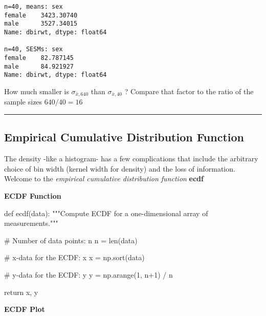 \documentclass[
  letterpaper,
  DIV=11,
  numbers=noendperiod]{scrreprt}
\newenvironment{Shaded}{\begin{snugshade}}{\end{snugshade}}
\newcommand{\BuiltInTok}[1]{\textcolor[rgb]{0.00,0.23,0.31}{#1}}
\newcommand{\CommentTok}[1]{\textcolor[rgb]{0.37,0.37,0.37}{#1}}
\newcommand{\ControlFlowTok}[1]{\textcolor[rgb]{0.00,0.23,0.31}{#1}}
\newcommand{\DecValTok}[1]{\textcolor[rgb]{0.68,0.00,0.00}{#1}}
\newcommand{\KeywordTok}[1]{\textcolor[rgb]{0.00,0.23,0.31}{#1}}
\newcommand{\NormalTok}[1]{\textcolor[rgb]{0.00,0.23,0.31}{#1}}
\newcommand{\OperatorTok}[1]{\textcolor[rgb]{0.37,0.37,0.37}{#1}}
\begin{document}
\begin{verbatim}
n=40, means: sex
female    3423.30740
male      3527.34015
Name: dbirwt, dtype: float64

n=40, SESMs: sex
female    82.787145
male      84.921927
Name: dbirwt, dtype: float64
\end{verbatim}

How much smaller is \(\sigma_{\bar{x},640}\) than
\(\sigma_{\bar{x},40}\) ? Compare that factor to the ratio of the sample
sizes \(640/40 = 16\)

\begin{center}\rule{0.5\linewidth}{0.5pt}\end{center}

\hypertarget{empirical-cumulative-distribution-function}{%
\subsection{Empirical Cumulative Distribution
Function}\label{empirical-cumulative-distribution-function}}

The density -like a histogram- has a few complications that include the
arbitrary choice of bin width (kernel width for density) and the loss of
information. Welcome to the \emph{empirical cumulative distribution
function} \textbf{ecdf}

\textbf{ECDF Function}

\begin{Shaded}
\begin{Highlighting}[]
\KeywordTok{def}\NormalTok{ ecdf(data):}
    \CommentTok{"""Compute ECDF for a one{-}dimensional array of measurements."""}

    \CommentTok{\# Number of data points: n}
\NormalTok{    n }\OperatorTok{=} \BuiltInTok{len}\NormalTok{(data)}

    \CommentTok{\# x{-}data for the ECDF: x}
\NormalTok{    x }\OperatorTok{=}\NormalTok{ np.sort(data)}

    \CommentTok{\# y{-}data for the ECDF: y}
\NormalTok{    y }\OperatorTok{=}\NormalTok{ np.arange(}\DecValTok{1}\NormalTok{, n}\OperatorTok{+}\DecValTok{1}\NormalTok{) }\OperatorTok{/}\NormalTok{ n}

    \ControlFlowTok{return}\NormalTok{ x, y}
\end{Highlighting}
\end{Shaded}

\textbf{ECDF Plot}
\end{document}
